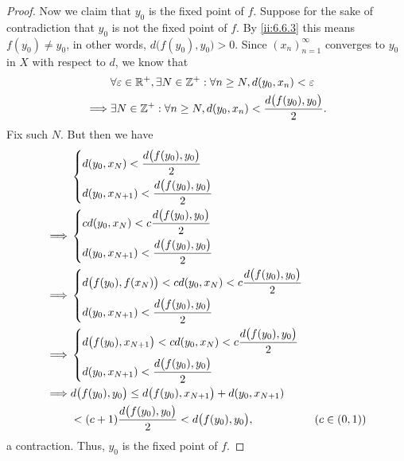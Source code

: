 \begin{proof}
  Now we claim that \(y_0\) is the fixed point of \(f\).
  Suppose for the sake of contradiction that \(y_0\) is not the fixed point of \(f\).
  By \cref{ii:6.6.3} this means \(f(y_0) \neq y_0\), in other words, \(d\big(f(y_0), y_0\big) > 0\).
  Since \((x_n)_{n = 1}^\infty\) converges to \(y_0\) in \(X\) with respect to \(d\), we know that
  \begin{align*}
             & \forall \varepsilon \in \mathbb{R}^+, \exists N \in \mathbb{Z}^+ : \forall n \geq N, d(y_0, x_n) < \varepsilon \\
    \implies & \exists N \in \mathbb{Z}^+ : \forall n \geq N, d(y_0, x_n) < \dfrac{d\big(f(y_0), y_0\big)}{2}.
  \end{align*}
  Fix such \(N\).
  But then we have
  \begin{align*}
             & \begin{dcases}
                 d(y_0, x_N) < \dfrac{d\big(f(y_0), y_0\big)}{2} \\
                 d(y_0, x_{N + 1}) < \dfrac{d\big(f(y_0), y_0\big)}{2}
               \end{dcases}                                                   \\
    \implies & \begin{dcases}
                 c d(y_0, x_N) < c \dfrac{d\big(f(y_0), y_0\big)}{2} \\
                 d(y_0, x_{N + 1}) < \dfrac{d\big(f(y_0), y_0\big)}{2}
               \end{dcases}                                                   \\
    \implies & \begin{dcases}
                 d\big(f(y_0), f(x_N)\big) < c d(y_0, x_N) < c \dfrac{d\big(f(y_0), y_0\big)}{2} \\
                 d(y_0, x_{N + 1}) < \dfrac{d\big(f(y_0), y_0\big)}{2}
               \end{dcases}                        \\
    \implies & \begin{dcases}
                 d\big(f(y_0), x_{N + 1}\big) < c d(y_0, x_N) < c \dfrac{d\big(f(y_0), y_0\big)}{2} \\
                 d(y_0, x_{N + 1}) < \dfrac{d\big(f(y_0), y_0\big)}{2}
               \end{dcases}                     \\
    \implies & d\big(f(y_0), y_0\big) \leq d\big(f(y_0), x_{N + 1}\big) + d(y_0, x_{N + 1})                           \\
             & < (c + 1) \dfrac{d\big(f(y_0), y_0\big)}{2} < d\big(f(y_0), y_0\big),                 & (c \in (0, 1))
  \end{align*}
  a contraction.
  Thus, \(y_0\) is the fixed point of \(f\).
\end{proof}

